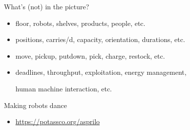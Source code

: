 \begin{frame}{What's (not) in the picture?}
  \bigskip
  \begin{itemize}
  \item {}

    floor,
    robots,
    shelves,
    products,
    people,
    etc.
    \medskip
  \item {}

    positions,
    carries/d,
    capacity,
    orientation,
    durations,
    etc.
    \medskip
  \item {}

    move,
    pickup,
    putdown,
    pick,
    charge,
    restock,
    etc.
    \medskip
  \item {}

    deadlines,
    throughput,
    exploitation,
    energy management,\par
    human machine interaction,
    etc.
  \end{itemize}
  \bigskip
\end{frame}
\begin{frame}[c]{Making robots dance}
  \begin{center}
  \end{center}
  \begin{itemize}
  \item {} \url{https://potassco.org/asprilo}
  \end{itemize}
\end{frame}
%
